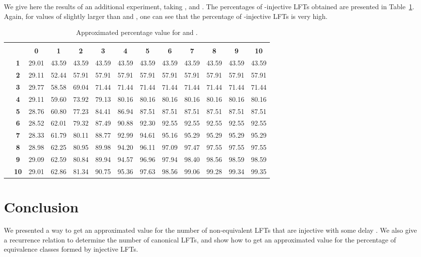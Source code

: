 \documentclass{ocg}
\newcommand{\LFT}{LFT}
\begin{document}
We give here the results of an additional experiment, taking ,  and . The percentages of -injective \LFT{}s obtained are presented in Table~\ref{table88x}. Again, for values of  slightly larger than  and , one can see that  the percentage of -injective \LFT{}s is very high. 
\begin{table}[h]
  \centering\scriptsize
  \begin{tabular}{|c|c|c|c|c|c|c|c|c|c|c|c|c|}\cline{3-13}
    \multicolumn{1}{c}{}&\multicolumn{1}{c}{} & \multicolumn{11}{|c|}{\footnotesize }\\
    \cline{3-13} 
    \multicolumn{2}{c|}{}&\bf 0&\bf1&\bf2&\bf3&\bf4&\bf5&\bf6&\bf7&\bf8&\bf9&\bf10\\\hline
    \multirow{10}{*}{\footnotesize }& \bf 1
&29.01&43.59&43.59&43.59&43.59&43.59&43.59&43.59&43.59&43.59&43.59\\    \cline{2-13}
&\bf 2&29.11&52.44&57.91&57.91&57.91&57.91&57.91&57.91&57.91&57.91&57.91\\    \cline{2-13}
&\bf 3&29.77&58.58&69.04&71.44&71.44&71.44&71.44&71.44&71.44&71.44&71.44\\    \cline{2-13}
&\bf 4&29.11&59.60&73.92&79.13&80.16&80.16&80.16&80.16&80.16&80.16&80.16\\    \cline{2-13}
&\bf 5&28.76&60.80&77.23&84.41&86.94&87.51&87.51&87.51&87.51&87.51&87.51\\    \cline{2-13}
&\bf 6&28.52&62.01&79.32&87.49&90.88&92.30&92.55&92.55&92.55&92.55&92.55\\    \cline{2-13}
&\bf 7&28.33&61.79&80.11&88.77&92.99&94.61&95.16&95.29&95.29&95.29&95.29\\    \cline{2-13}
&\bf 8&28.98&62.25&80.95&89.98&94.20&96.11&97.09&97.47&97.55&97.55&97.55\\    \cline{2-13}
&\bf 9&29.09&62.59&80.84&89.94&94.57&96.96&97.94&98.40&98.56&98.59&98.59\\    \cline{2-13}
&\bf 10&29.01&62.86&81.34&90.75&95.36&97.63&98.56&99.06&99.28&99.34&99.35\\    \cline{2-13}   
\hline
  \end{tabular}
  \caption{Approximated percentage value for  and .}
  \label{table88x}
\end{table}


\section{Conclusion}
We presented a way to get an approximated value for the number of non-equivalent \LFT{}s that are injective with some delay . We also give a recurrence relation to determine the number of canonical \LFT{}s, and show how to get an approximated value for the percentage of equivalence classes formed by injective \LFT{}s. 
\end{document}
